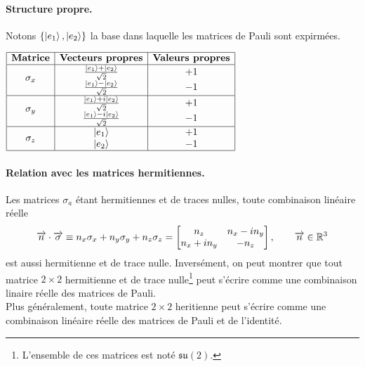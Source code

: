 \documentclass[11pt,a4paper,oneside]{article}
\begin{document}
\paragraph*{Structure propre.} Notons $\{\ket{e_1},\ket{e_2}\}$ la base dans laquelle les matrices de Pauli sont expirmées.
\begin{table}[H]
    \centering
    $
    \begin{array}{|c|c|c|}
        \hline
        \textbf{Matrice} & \textbf{Vecteurs propres} & \textbf{Valeurs propres} \\ \hline
        \multirow{2}{*}{$\sigma_x$} & \frac{\ket{e_1}+\ket{e_2}}{\sqrt{2}} & +1 \\
        & \frac{\ket{e_1}-\ket{e_2}}{\sqrt{2}} & -1 \\ \hline
        \multirow{2}{*}{$\sigma_y$} & \frac{\ket{e_1}+i\ket{e_2}}{\sqrt{2}} & +1 \\
        & \frac{\ket{e_1}-i\ket{e_2}}{\sqrt{2}} & -1 \\ \hline
        \multirow{2}{*}{$\sigma_z$} & \ket{e_1} & +1 \\
        & \ket{e_2} & -1 \\ \hline
    \end{array}
    $
\end{table}

\paragraph*{Relation avec les matrices hermitiennes.} Les matrices $\sigma_a$ étant hermitiennes et de traces nulles, toute combinaison linéaire réelle
\begin{equation}
    \overrightarrow{n}\cdot\overrightarrow{\sigma}\equiv n_x\sigma_x+n_y\sigma_y+n_z\sigma_z = 
    \begin{bmatrix}
        n_z & n_x-in_y\\
        n_x+in_y & -n_z
    \end{bmatrix},\qquad \overrightarrow{n}\in\mathbb{R}^3
\end{equation}
est aussi hermitienne et de trace nulle. Inversément, on peut montrer que tout matrice $2\times2$ hermitienne et de trace nulle\footnote{L'ensemble de ces matrices est noté $\mathfrak{su}(2)$.} peut s'écrire comme une combinaison linaire réelle des matrices de Pauli.\\

Plus généralement, toute matrice $2\times 2$ heritienne peut s'écrire comme une combinaison linéaire réelle des matrices de Pauli et de l'identité.
\end{document}
